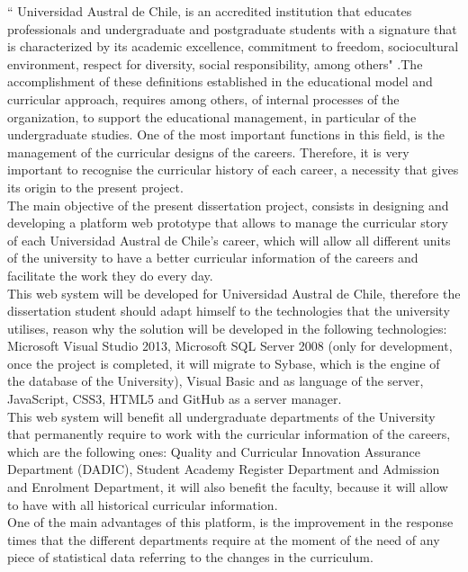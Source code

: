 `` Universidad Austral de Chile, is an accredited institution that educates professionals and undergraduate and postgraduate students with a signature that is characterized by its academic excellence, commitment to freedom, sociocultural environment, respect for diversity, social responsibility, among others"\hspace{0.2cm} \cite{MOD07}.The accomplishment of these definitions established in the educational model and curricular approach, requires among others, of internal processes of the organization, to support the educational management, in particular of the undergraduate studies. 
One of the most important functions in this field, is the management of the curricular designs of the careers. Therefore, it is very important to recognise the curricular history of each career, a necessity that gives its origin to the present project.
\\

The main objective of the present dissertation project, consists in designing and developing a platform web prototype that allows to manage the curricular story of each Universidad Austral de Chile’s career, which will allow all different units of the university to have a better curricular information of the careers and facilitate the work they do every day.
\\

This web system will be developed for Universidad Austral de Chile, therefore the dissertation student should adapt himself to the technologies that the university utilises, reason why the solution will be developed in the following technologies: Microsoft Visual Studio 2013, Microsoft SQL Server 2008 (only for development, once the project is completed, it will migrate to Sybase, which is the engine of the database of the University), Visual Basic and as language of the server, JavaScript, CSS3, HTML5 and GitHub as a server manager.
\\

This web system will benefit all undergraduate departments of the University that permanently require to work with the curricular information of the careers, which are the following ones: Quality and Curricular Innovation Assurance Department (DADIC), Student Academy Register Department and Admission and Enrolment Department, it will also benefit the faculty, because it will allow to have with all historical curricular information.
\\

One of the main advantages of this platform, is the improvement in the response times that the different departments require at the moment of the need of any piece of statistical data referring to the changes in the curriculum. 